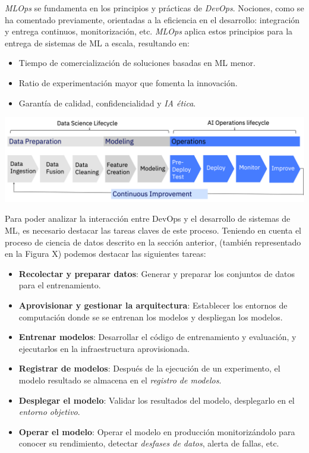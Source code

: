 \documentclass[
  12pt,
  a4paperpaper,
]{report}
\providecommand{\tightlist}{%
  \setlength{\itemsep}{0pt}\setlength{\parskip}{0pt}}
\begin{document}
\emph{MLOps} se fundamenta en los principios y prácticas de
\emph{DevOps}. Nociones, como se ha comentado previamente, orientadas a
la eficiencia en el desarrollo: integración y entrega continuos,
monitorización, etc. \emph{MLOps} aplica estos principios para la
entrega de sistemas de ML a escala, resultando en:

\begin{itemize}
\tightlist
\item
  Tiempo de comercialización de soluciones basadas en ML menor.
\item
  Ratio de experimentación mayor que fomenta la innovación.
\item
  Garantía de calidad, confidencialidad y \emph{IA ética}.
\end{itemize}

\includegraphics{source/figures/mlops_overview.png}

Para poder analizar la interacción entre DevOps y el desarrollo de
sistemas de ML, es necesario destacar las tareas claves de este proceso.
Teniendo en cuenta el proceso de ciencia de datos descrito en la sección
anterior, (también representado en la Figura X) podemos destacar las
siguientes tareas:

\begin{itemize}
\item
  \textbf{Recolectar y preparar datos}: Generar y preparar los conjuntos
  de datos para el entrenamiento.
\item
  \textbf{Aprovisionar y gestionar la arquitectura}: Establecer los
  entornos de computación donde se se entrenan los modelos y despliegan
  los modelos.
\item
  \textbf{Entrenar modelos}: Desarrollar el código de entrenamiento y
  evaluación, y ejecutarlos en la infraestructura aprovisionada.
\item
  \textbf{Registrar de modelos}: Después de la ejecución de un
  experimento, el modelo resultado se almacena en el \emph{registro de
  modelos}.
\item
  \textbf{Desplegar el modelo}: Validar los resultados del modelo,
  desplegarlo en el \emph{entorno objetivo}.
\item
  \textbf{Operar el modelo}: Operar el modelo en producción
  monitorizándolo para conocer su rendimiento, detectar \emph{desfases
  de datos}, alerta de fallas, etc.
\end{itemize}
\end{document}
